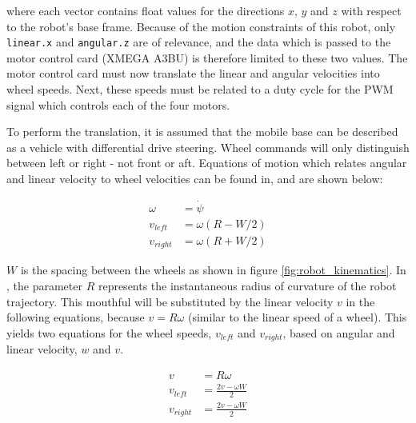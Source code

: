 where each vector contains float values for the directions $x$, $y$ and $z$ with respect to the robot's base frame. Because of the motion constraints of this robot, only \texttt{linear.x} and \texttt{angular.z} are of relevance, and the data which is passed to the motor control card (XMEGA A3BU) is therefore limited to these two values. The motor control card must now translate the linear and angular velocities into wheel speeds. Next, these speeds must be related to a duty cycle for the \ac{PWM} signal which controls each of the four motors.

To perform the translation, it is assumed that the mobile base can be described as a vehicle with differential drive steering. Wheel commands will only distinguish between left or right - not front or aft. Equations of motion which relates angular and linear velocity to wheel velocities can be found in\cite{cook2011mobile}, and are shown below:

\begin{subequations}\label{eq:subeqns}
  	\begin{align}
	  	\omega &= \dot{\psi} \\
	   	v_{left} &= \omega (R - W/2)\\
	   	v_{right} &= \omega (R + W/2) \label{eq:subeq2}
   	\end{align}
\end{subequations}

$W$ is the spacing between the wheels as shown in figure \ref{fig:robot_kinematics}. In \cite{cook2011mobile}, the parameter $R$ represents the instantaneous radius of curvature of the robot trajectory. This mouthful will be substituted by the linear velocity $v$ in the following equations, because $v = R\omega$ (similar to the linear speed of a wheel). This yields two equations for the wheel speeds, $v_{left}$ and $v_{right}$, based on angular and linear velocity, $w$ and $v$.

 \begin{subequations}%
 	\begin{align}
 	v &= R\omega \\
 	v_{left} &=  \frac{2v - \omega W}{2}\\
 	v_{right} &= \frac{2v - \omega W}{2} %
 	\end{align}
 \end{subequations}

